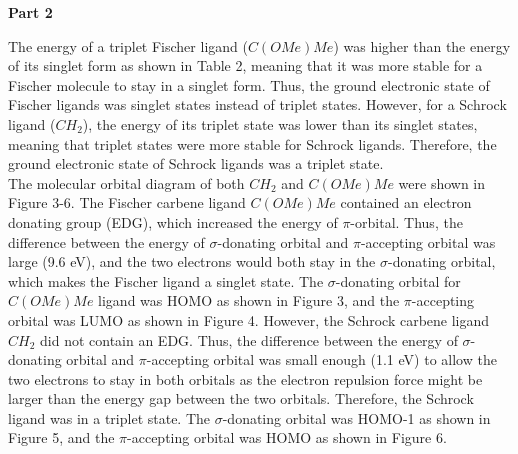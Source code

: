 \documentclass[twocolumn]{article} %
\begin{document}







\textbf{Part 2}

The energy of a triplet Fischer ligand ($C(OMe)Me$) was higher than the energy of its singlet form as shown in Table 2, meaning that it was more stable for a Fischer molecule to stay in a singlet form. Thus, the ground electronic state of Fischer ligands was singlet states instead of triplet states. However, for a Schrock ligand ($CH_2$), the energy of its triplet state was lower than its singlet states, meaning that triplet states were more stable for Schrock ligands. Therefore, the ground electronic state of Schrock ligands was a triplet state. \\[1\baselineskip]

The molecular orbital diagram of both $CH_2$ and $C(OMe)Me$ were shown in Figure 3-6. The Fischer carbene ligand $C(OMe)Me$ contained an electron donating group (EDG), which increased the energy of $\pi$-orbital. Thus, the difference between the energy of $\sigma$-donating orbital and $\pi$-accepting orbital was large (9.6 eV), and the two electrons would both stay in the $\sigma$-donating orbital, which makes the Fischer ligand a singlet state. 
The $\sigma$-donating orbital for $C(OMe)Me$ ligand was HOMO as shown in Figure 3, and the $\pi$-accepting orbital was LUMO as shown in Figure 4.
However, the Schrock carbene ligand $CH_2$ did not contain an EDG. Thus, the difference between the energy of $\sigma$-donating orbital and $\pi$-accepting orbital was small enough (1.1 eV) to allow the two electrons to stay in both orbitals as the electron repulsion force might be larger than the energy gap between the two orbitals. Therefore, the Schrock ligand was in a triplet state. The $\sigma$-donating orbital was HOMO-1  as shown in Figure 5, and the $\pi$-accepting orbital was HOMO as shown in Figure 6. \\[1\baselineskip]
\end{document}
